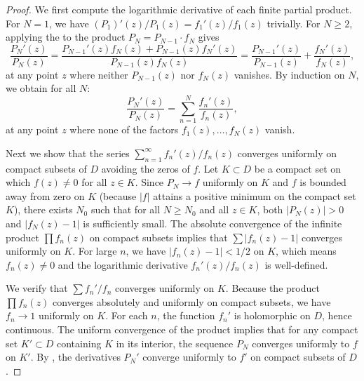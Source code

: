 \begin{proposition}
\begin{proof}
	We first compute the logarithmic derivative of each finite partial product. For $N = 1$, we have $(P_1)'(z)/P_1(z) = f_1'(z)/f_1(z)$ trivially. For $N \geq 2$, applying the  to the product $P_N = P_{N-1} \cdot f_N$ gives
	$$\frac{P_N'(z)}{P_N(z)} = \frac{P_{N-1}'(z)f_N(z) + P_{N-1}(z)f_N'(z)}{P_{N-1}(z)f_N(z)} = \frac{P_{N-1}'(z)}{P_{N-1}(z)} + \frac{f_N'(z)}{f_N(z)},$$
	at any point $z$ where neither $P_{N-1}(z)$ nor $f_N(z)$ vanishes. By induction on $N$, we obtain for all $N$:
	$$\frac{P_N'(z)}{P_N(z)} = \sum_{n=1}^N \frac{f_n'(z)}{f_n(z)},$$
	at any point $z$ where none of the factors $f_1(z), \dots, f_N(z)$ vanish.

	Next we show that the series $\sum_{n=1}^\infty f_n'(z)/f_n(z)$ converges uniformly on compact subsets of $D$ avoiding the zeros of $f$. Let $K \subset D$ be a compact set on which $f(z) \neq 0$ for all $z \in K$. Since $P_N \to f$ uniformly on $K$ and $f$ is bounded away from zero on $K$ (because $|f|$ attains a positive minimum on the compact set $K$), there exists $N_0$ such that for all $N \geq N_0$ and all $z \in K$, both $|P_N(z)| > 0$ and $|f_N(z) - 1|$ is sufficiently small. The absolute convergence of the infinite product $\prod f_n(z)$ on compact subsets implies that $\sum |f_n(z) - 1|$ converges uniformly on $K$. For large $n$, we have $|f_n(z) - 1| < 1/2$ on $K$, which means $f_n(z) \neq 0$ and the logarithmic derivative $f_n'(z)/f_n(z)$ is well-defined.

	We verify that $\sum f_n'/f_n$ converges uniformly on $K$. Because the product $\prod f_n(z)$ converges absolutely and uniformly on compact subsets, we have $f_n \to 1$ uniformly on $K$. For each $n$, the function $f_n'$ is holomorphic on $D$, hence continuous. The uniform convergence of the product implies that for any compact set $K' \subset D$ containing $K$ in its interior, the sequence $P_N$ converges uniformly to $f$ on $K'$. By , the derivatives $P_N'$ converge uniformly to $f'$ on compact subsets of $D$.


\end{proof}
\end{proposition}
